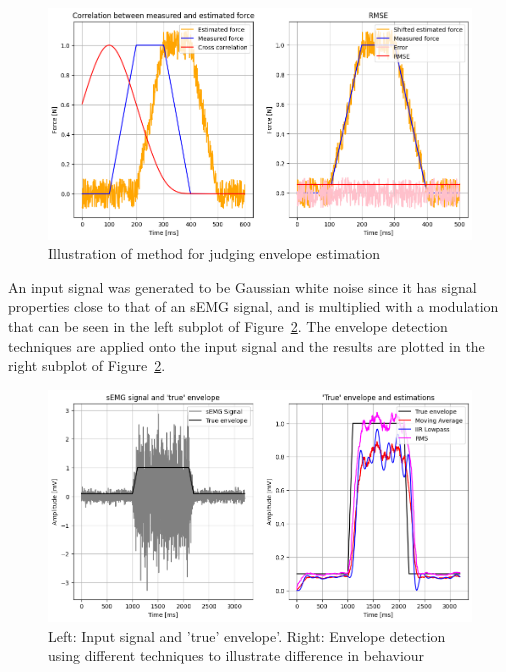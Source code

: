 \begin{figure}[h!t]
	\begin{center}
		\includegraphics[width=1.0\columnwidth]{images/envelope_estimation_method.png}
	\end{center}
	\caption{Illustration of method for judging envelope estimation}
	\label{fig:envelope_estimation_method}
\end{figure}

An input signal was generated to be Gaussian white noise since it has signal properties close to that of an sEMG signal, and is multiplied with a modulation that can be seen in the left subplot of Figure~\ref{fig:envelope_detection}. The envelope detection techniques are applied onto the input signal and the results are plotted in the right subplot of Figure~\ref{fig:envelope_detection}.

\begin{figure}[h!t]
	\begin{center}
		\includegraphics[width=1.0\columnwidth]{images/envelope_detection.png}
	\end{center}
	\caption{Left: Input signal and 'true' envelope'. Right: Envelope detection using different techniques to illustrate difference in behaviour}
	\label{fig:envelope_detection}
\end{figure}

